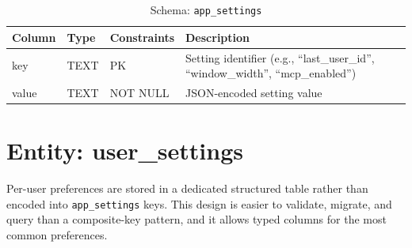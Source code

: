 \documentclass[a4paper, 11pt, oneside]{report}
\begin{document}
\begin{table}[H]
  \centering
  \caption{Schema: \texttt{app\_settings}}
  \label{tab:schema-settings}
  \begin{tabularx}{\textwidth}{l l l X}
    \toprule
    \textbf{Column} & \textbf{Type} & \textbf{Constraints} & \textbf{Description} \\
    \midrule
    key   & TEXT & PK       & Setting identifier (e.g., ``last\_user\_id'',
                              ``window\_width'', ``mcp\_enabled'') \\
    value & TEXT & NOT NULL & JSON-encoded setting value \\
    \bottomrule
  \end{tabularx}
\end{table}

\section{Entity: user\_settings}
\label{sec:entity-user-settings}

Per-user preferences are stored in a dedicated structured table rather than
encoded into \texttt{app\_settings} keys.  This design is easier to
validate, migrate, and query than a composite-key pattern, and it allows
typed columns for the most common preferences.
\end{document}
